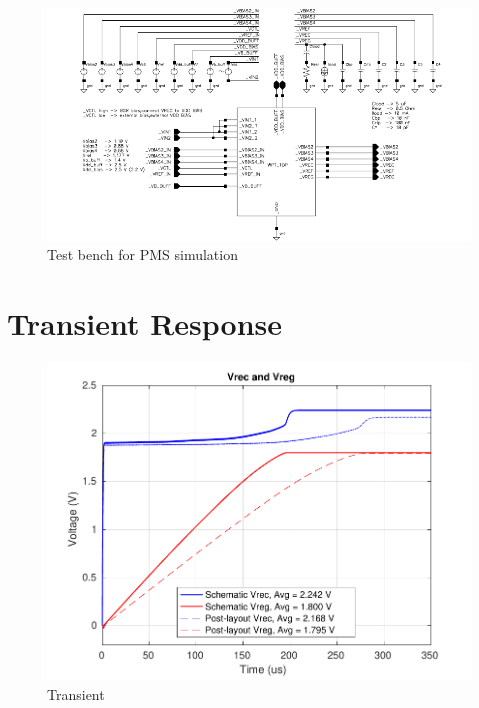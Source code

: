 \documentclass[12pt,a4paper,UKenglish]{article}
\begin{document}
\vspace{5mm}

\begin{figure} [H]
  \centering
  \includegraphics[width=\textwidth]{img/wpt_top_testbench.pdf} 
 \caption{Test bench for PMS simulation } 
\label{fig:wpt_top_testbench} 
\end{figure}

\section{Transient Response}

\begin{figure} [H]
  \centering
  \includegraphics[width=\textwidth]{img/wpt_V_wo_bgr_both.pdf} 
 \caption{Transient } 
\label{fig:wpt_V_wo} 
\end{figure}
\end{document}
